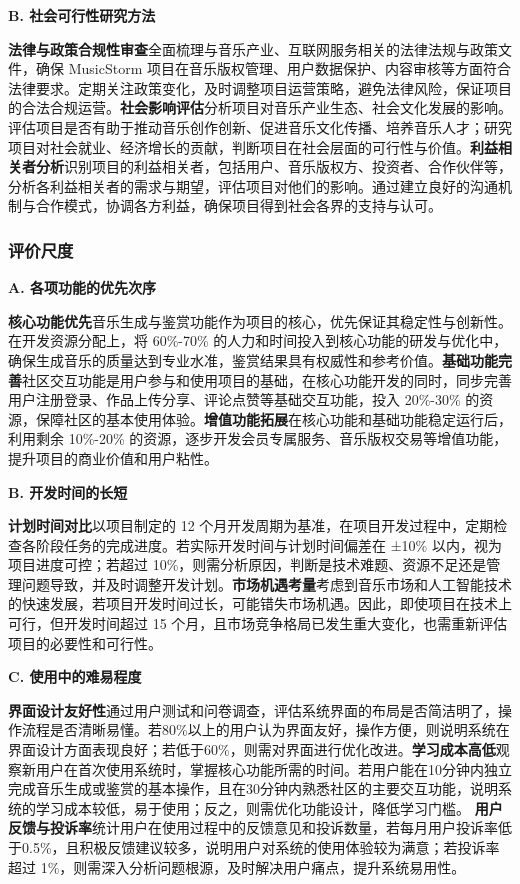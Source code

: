 \documentclass{base}
\numberwithin{figure}{section} %
\begin{document}
\textbf{B. 社会可行性研究方法}

\textbf{法律与政策合规性审查}\quad 全面梳理与音乐产业、互联网服务相关的法律法规与政策文件，确保 MusicStorm 项目在音乐版权管理、用户数据保护、内容审核等方面符合法律要求。定期关注政策变化，及时调整项目运营策略，避免法律风险，保证项目的合法合规运营。​
\textbf{社会影响评估}\quad 分析项目对音乐产业生态、社会文化发展的影响。评估项目是否有助于推动音乐创作创新、促进音乐文化传播、培养音乐人才；研究项目对社会就业、经济增长的贡献，判断项目在社会层面的可行性与价值。​
\textbf{利益相关者分析}\quad 识别项目的利益相关者，包括用户、音乐版权方、投资者、合作伙伴等，分析各利益相关者的需求与期望，评估项目对他们的影响。通过建立良好的沟通机制与合作模式，协调各方利益，确保项目得到社会各界的支持与认可。​

\subsubsection{评价尺度}

\textbf{A. 各项功能的优先次序​}

\textbf{核心功能优先}\quad 音乐生成与鉴赏功能作为项目的核心，优先保证其稳定性与创新性。在开发资源分配上，将 60\%-70\% 的人力和时间投入到核心功能的研发与优化中，确保生成音乐的质量达到专业水准，鉴赏结果具有权威性和参考价值。​
\textbf{基础功能完善}\quad 社区交互功能是用户参与和使用项目的基础，在核心功能开发的同时，同步完善用户注册登录、作品上传分享、评论点赞等基础交互功能，投入 20\%-30\% 的资源，保障社区的基本使用体验。​
\textbf{增值功能拓展}\quad 在核心功能和基础功能稳定运行后，利用剩余 10\%-20\% 的资源，逐步开发会员专属服务、音乐版权交易等增值功能，提升项目的商业价值和用户粘性。

\textbf{B. 开发时间的长短​}

\textbf{计划时间对比}\quad 以项目制定的 12 个月开发周期为基准，在项目开发过程中，定期检查各阶段任务的完成进度。若实际开发时间与计划时间偏差在 ±10\% 以内，视为项目进度可控；若超过 10\%，则需分析原因，判断是技术难题、资源不足还是管理问题导致，并及时调整开发计划。​
\textbf{市场机遇考量}\quad 考虑到音乐市场和人工智能技术的快速发展，若项目开发时间过长，可能错失市场机遇。因此，即使项目在技术上可行，但开发时间超过 15 个月，且市场竞争格局已发生重大变化，也需重新评估项目的必要性和可行性。

\textbf{C. 使用中的难易程度}

\textbf{界面设计友好性}\quad 通过用户测试和问卷调查，评估系统界面的布局是否简洁明了，操作流程是否清晰易懂。若80\%以上的用户认为界面友好，操作方便，则说明系统在界面设计方面表现良好；若低于60\%，则需对界面进行优化改进。​
\textbf{学习成本高低}\quad 观察新用户在首次使用系统时，掌握核心功能所需的时间。若用户能在10分钟内独立完成音乐生成或鉴赏的基本操作，且在30分钟内熟悉社区的主要交互功能，说明系统的学习成本较低，易于使用；反之，则需优化功能设计，降低学习门槛。
\textbf{用户反馈与投诉率}\quad 统计用户在使用过程中的反馈意见和投诉数量，若每月用户投诉率低于0.5\%，且积极反馈建议较多，说明用户对系统的使用体验较为满意；若投诉率超过 1\%，则需深入分析问题根源，及时解决用户痛点，提升系统易用性。
\end{document}

